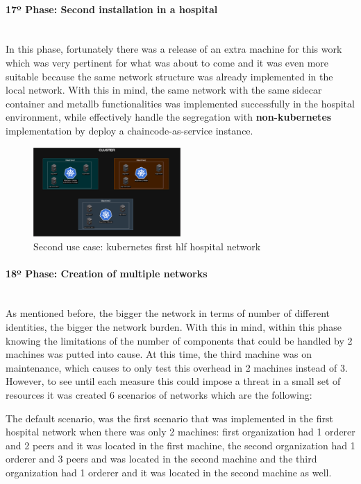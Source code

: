 \paragraph{17º Phase: Second installation in a hospital}\mbox{}\\
In this phase, fortunately there was a release of an extra machine for this work which was very pertinent for what was about to come and it was even more suitable because the same network structure was already implemented in the local network. With this in mind, the same network with the same sidecar container and metallb functionalities was implemented successfully in the hospital environment, while effectively handle the segregation with \textbf{non-kubernetes} implementation by deploy a chaincode-as-service instance.
\begin{figure}[H]
    \centering
    \includegraphics[width=0.5\textwidth]{assets/use-case-2/kubernetes-network.drawio.png} %
    \caption{Second use case: kubernetes first hlf hospital network}
    \label{fig:sample-image} 
\end{figure}

\paragraph{18º Phase: Creation of multiple networks}\mbox{}\\
As mentioned before, the bigger the network in terms of number of different identities, the bigger the network burden. With this in mind, within this phase knowing the limitations of the number of components that could be handled by 2 machines was putted into cause. At this time, the third machine was on maintenance, which causes to only test this overhead in 2 machines instead of 3. However, to see until each measure this could impose a threat in a small set of resources it was created 6 scenarios of networks which are the following:

The default scenario, was the first scenario that was implemented in the first hospital network when there was only 2 machines: first organization had 1 orderer and 2 peers and it was located in the first machine, the second organization had 1 orderer and 3 peers and was located in the second machine and the third organization had 1 orderer and it was located in the second machine as well.

